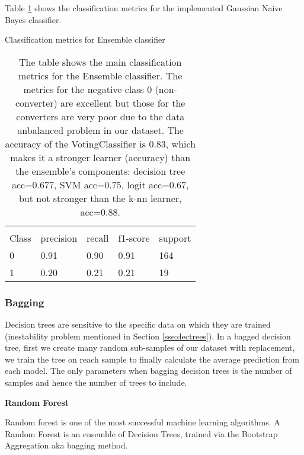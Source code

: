 \documentclass[11pt]{article}
\theoremstyle{definition}
\theoremstyle{remark}
\begin{document}
Table \ref{tab:ensemble} shows the classification metrics for the implemented Gaussian Naive Bayes classifier.
\begin{table}[H]
\caption{Classification metrics for Ensemble classifier}
\begin{center} 
\begin{tabular}{lllll}
\hline
\multicolumn{1}{c}{} \\
Class & precision & recall & f1-score & support     \\
\hline
0 & 0.91  &    0.90   &   0.91   &    164 \\
1 & 0.20  &    0.21   &   0.21   &    19 \\
\hline
\end{tabular}
\caption{The table shows the main classification metrics for the Ensemble classifier. The metrics for the negative class 0 (non-converter) are excellent but those for the converters are very poor due to the data unbalanced problem in our dataset.
The accuracy of the VotingClassifier is 0.83, which makes it a stronger learner (accuracy) than the ensemble's components: decision tree acc=0.677, SVM acc=0.75, logit acc=0.67, but not stronger than the k-nn learner, acc=0.88.
}  \label{tab:ensemble} 
\end{center}
\end{table}


\subsubsection{Bagging}
\label{se:resrf}

Decision trees are sensitive to the specific data on which they are trained (inestability problem mentioned in Section \ref{sse:dectrees}). In a bagged decision tree, first we create many random sub-samples of our dataset with replacement, we train the tree on reach sample to finally calculate the average prediction from each model. The only parameters when bagging decision trees is the number of samples and hence the number of trees to include.

\textbf{Random Forest}

Random forest is one of the most successful machine learning algorithms. A Random Forest is an ensemble of Decision Trees, trained via the  Bootstrap Aggregation aka bagging method. 
\end{document}
